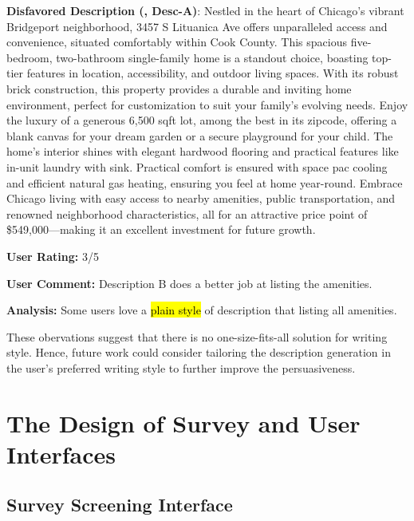\begin{center}
\begin{tcolorbox}[colback=white,colframe=gray!20,width=0.95\textwidth]
    {\footnotesize \textbf{Disfavored Description (\agentname, Desc-A)}:  Nestled in the heart of Chicago's vibrant Bridgeport neighborhood, 3457 S Lituanica Ave offers unparalleled access and convenience, situated comfortably within Cook County. This spacious five-bedroom, two-bathroom single-family home is a standout choice, boasting top-tier features in location, accessibility, and outdoor living spaces. With its robust brick construction, this property provides a durable and inviting home environment, perfect for customization to suit your family’s evolving needs. Enjoy the luxury of a generous 6,500 sqft lot, among the best in its zipcode, offering a blank canvas for your dream garden or a secure playground for your child. The home’s interior shines with elegant hardwood flooring and practical features like in-unit laundry with sink. Practical comfort is ensured with space pac cooling and efficient natural gas heating, ensuring you feel at home year-round. Embrace Chicago living with easy access to nearby amenities, public transportation, and renowned neighborhood characteristics, all for an attractive price point of \$549,000—making it an excellent investment for future growth. }
    \vspace{0.2em}

    {\footnotesize \textbf{User Rating:} 3/5 }
    \vspace{0.2em}

    {\footnotesize \textbf{User Comment:} Description B does a better job at listing the amenities. }
    \vspace{0.2em}

   {\footnotesize \textbf{Analysis:} Some users love a \hl{plain style} of description that listing all amenities.  }
    \end{tcolorbox}\end{center}

These obervations suggest that there is no one-size-fits-all solution for writing style. Hence, future work could consider tailoring the description generation in the user's preferred writing style to further improve the persuasiveness.

\section{The Design of Survey and User Interfaces}
\label{app: interface}

\subsection{Survey Screening Interface}
\label{app: screening-interface}

